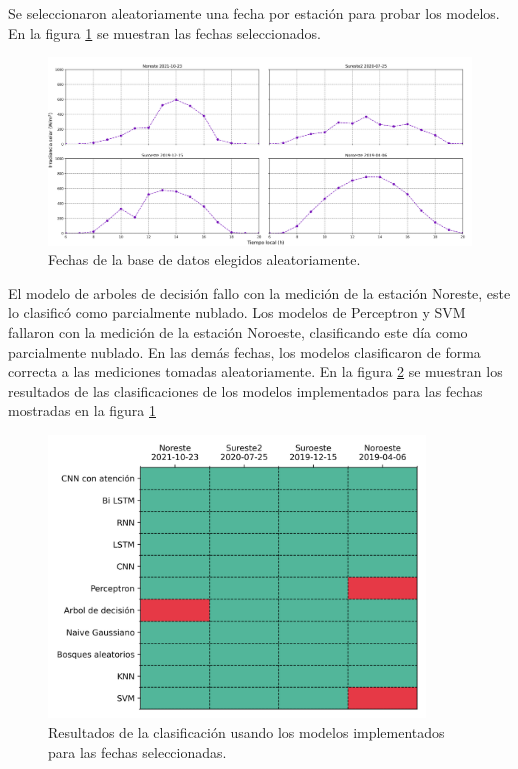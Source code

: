 Se seleccionaron aleatoriamente una fecha por estación para probar los modelos. En la figura \ref{fig:test_daily} se muestran las fechas seleccionados.
\begin{figure}[H]
	\centering
	\includegraphics[width=14cm]{Graphics/test_daily.png}
	\caption{Fechas de la base de datos elegidos aleatoriamente.}
	\label{fig:test_daily}
\end{figure}
El modelo de arboles de decisión fallo con la medición de la estación Noreste, este lo clasificó como parcialmente nublado. Los modelos de Perceptron y SVM fallaron con la medición de la estación Noroeste, clasificando este día como parcialmente nublado. En las demás fechas, los modelos clasificaron de forma correcta a las mediciones tomadas aleatoriamente. En la figura \ref{fig:test_models} se muestran los resultados de las clasificaciones de los modelos implementados para las fechas mostradas en la figura \ref{fig:test_daily}
\begin{figure}[H]
	\centering
	\includegraphics[width=10cm]{Graphics/Test_models.png}
	\caption{Resultados de la clasificación usando los modelos implementados para las fechas seleccionadas.}
	\label{fig:test_models}
\end{figure}
